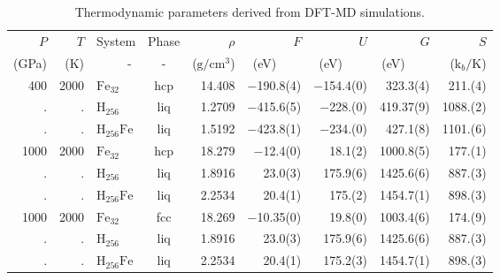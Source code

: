 \begin{table}
\centering

\caption{Thermodynamic parameters derived from DFT-MD simulations.\label{data}}
\begin{adjustbox}{max width=\textwidth}
\begin{tabular}{rrlcrrrrr}
    \hline
 {$P$} & {$T$} & {System} & {Phase} &
{$\rho$} & {$F$} & {$U$} & {$G$} & {$S$}\\
(GPa) & (K) & ~~~~~- &  - & ($\mathrm{g}/\mathrm{cm}^3$) & (eV)~~~~ & (eV)~~~~
& (eV)~~~~ & ($\mathrm{k}_b/\mathrm{K}$) \\
\hline
400   &  2000   &  $\mathrm{Fe}_{32}$     &  hcp  &  14.408  &  $-$190.8(4)\phantom{0}   &  $-$154.4(0)            &  323.3(4)\phantom{0}     &  211.(4)              \\
.     &  .      &  $\mathrm{H}_{256}$    &  liq  &  1.2709  &  $-$415.6(5)\phantom{0}   &  $-$228.(0)\phantom{0}  &  419.37(9)               &  1088.(2)             \\
.     &  .      &  $\mathrm{H}_{256}\mathrm{Fe}$  &  liq  &  1.5192  &  $-$423.8(1)\phantom{0}   &  $-$234.(0)\phantom{0}  &  427.1(8)\phantom{0}     &  1101.(6)             \\
1000  &  2000   &  $\mathrm{Fe}_{32}$     &  hcp  &  18.279  &  $-$12.4(0)\phantom{0}    &  18.1(2)                &  1000.8(5)\phantom{0}    &  177.(1)              \\
.     &  .      &  $\mathrm{H}_{256}$    &  liq  &  1.8916  &  23.0(3)\phantom{0}       &  175.9(6)               &  1425.6(6)\phantom{0}    &  887.(3)              \\
.     &  .      &  $\mathrm{H}_{256}\mathrm{Fe}$  &  liq  &  2.2534  &  20.4(1)\phantom{0}       &  175.(2)\phantom{0}     &  1454.7(1)\phantom{0}    &  898.(3)              \\
1000  &  2000   &  $\mathrm{Fe}_{32}$     &  fcc  &  18.269  &  $-$10.35(0)              &  19.8(0)                &  1003.4(6)\phantom{0}    &  174.(9)              \\
.     &  .      &  $\mathrm{H}_{256}$    &  liq  &  1.8916  &  23.0(3)\phantom{0}       &  175.9(6)               &  1425.6(6)\phantom{0}    &  887.(3)              \\
.     &  .      &  $\mathrm{H}_{256}\mathrm{Fe}$  &  liq  &  2.2534  &  20.4(1)\phantom{0}       &  175.2(3)               &  1454.7(1)\phantom{0}    &  898.(3)              \\

\end{tabular}
\end{adjustbox}
\end{table}
